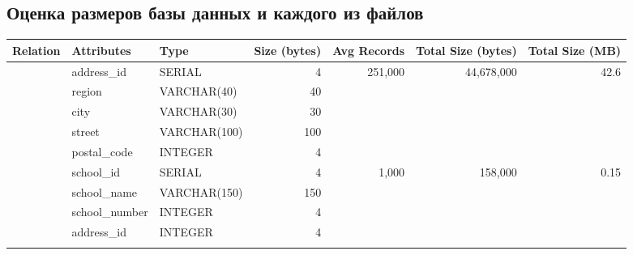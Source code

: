 \documentclass[a4paper]{article}
\begin{document}
\subsection{Оценка размеров базы данных и каждого из файлов}

{\small
      \begin{longtable}{l p{2cm} p{2cm} r r r r}
            \toprule
            \textbf{Relation} & \textbf{Attributes}  & \textbf{Type}        & \textbf{Size (bytes)} & \textbf{Avg Records}       & \textbf{Total Size (bytes)}   & \textbf{Total Size (MB)} \\
            \midrule
            \endhead

            \bottomrule
            \endfoot

            \multirow{5}{*}{Address}
                              & address\_id          & SERIAL               & 4                     & \multirow{5}{*}{251,000}   & \multirow{5}{*}{44,678,000}   & \multirow{5}{*}{42.6}    \\
                              & region               & VARCHAR(40)          & 40                    &                            &                               &                          \\
                              & city                 & VARCHAR(30)          & 30                    &                            &                               &                          \\
                              & street               & VARCHAR(100)         & 100                   &                            &                               &                          \\
                              & postal\_code         & INTEGER              & 4                     &                            &                               &                          \\ \addlinespace
            \hline

            \multirow{3}{*}{School}
                              & school\_id           & SERIAL               & 4                     & \multirow{3}{*}{1,000}     & \multirow{3}{*}{158,000}      & \multirow{3}{*}{0.15}    \\
                              & school\_name         & VARCHAR(150)         & 150                   &                            &                               &                          \\
                              & school\_number       & INTEGER              & 4                     &                            &                               &                          \\
                              & address\_id          & INTEGER              & 4                     &                            &                               &                          \\ \addlinespace
            \hline


\end{longtable}}
\end{document}
